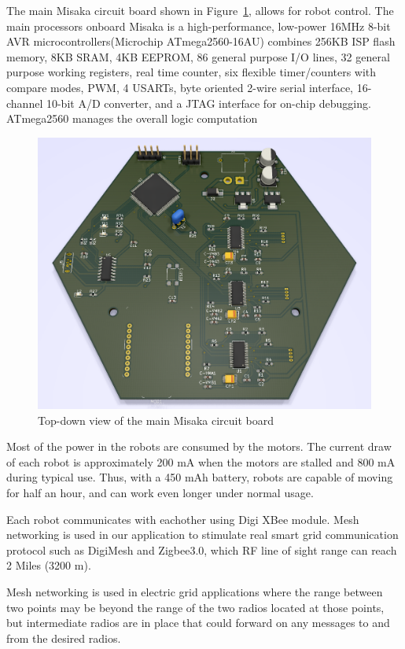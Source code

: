 \documentclass[conference]{IEEEtran}
\begin{document}
The main Misaka circuit board shown in Figure~\ref{fig:PCB}, allows for robot control. The main processors onboard Misaka is a high-performance, low-power 16MHz 8-bit AVR microcontrollers(Microchip ATmega2560-16AU) combines 256KB ISP flash memory, 8KB SRAM, 4KB EEPROM, 86 general purpose I/O lines, 32 general purpose working registers, real time counter, six flexible timer/counters with compare modes, PWM, 4 USARTs, byte oriented 2-wire serial interface, 16-channel 10-bit A/D converter, and a JTAG interface for on-chip debugging. ATmega2560 manages the overall logic computation

\begin{figure}[htbp]
    \centering
    \includegraphics[width=0.6\columnwidth]{PCB.png}
    \caption{Top-down view of the main Misaka circuit board}
    \label{fig:PCB}
\end{figure}

Most of the power in the robots are consumed by the motors. The current draw of each robot is approximately 200 mA when the motors are stalled and 800 mA during typical use. Thus, with a 450 mAh battery, robots are capable of moving for half an hour, and can work even longer under normal usage.

Each robot communicates with eachother using Digi XBee module. Mesh networking is used in our application to stimulate real smart grid communication protocol such as DigiMesh and Zigbee3.0, which RF line of sight range can reach 2 Miles (3200 m).

Mesh networking is used in electric grid applications where the range between two points may be beyond the range of the two radios located at those points, but intermediate radios are in place that could forward on any messages to and from the desired radios.

\end{document}
